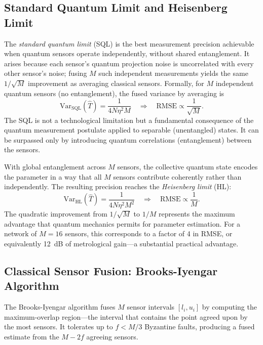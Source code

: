 \documentclass[twocolumn,11pt]{article}
\begin{document}
\subsection{Standard Quantum Limit and Heisenberg Limit}

The \textit{standard quantum limit} (SQL) is the best measurement
precision achievable when quantum sensors operate independently,
without shared entanglement.
It arises because each sensor's quantum projection noise is
uncorrelated with every other sensor's noise; fusing $M$ such
independent measurements yields the same $1/\sqrt{M}$ improvement
as averaging classical sensors.
Formally, for $M$ independent quantum sensors (no entanglement), the
fused variance by averaging is
\begin{equation}
    \mathrm{Var}_{\mathrm{SQL}}(\hat{T}) = \frac{1}{4N\eta^2 M}
    \quad \Rightarrow \quad
    \mathrm{RMSE} \propto \frac{1}{\sqrt{M}}.
    \label{eq:sql}
\end{equation}
The SQL is not a technological limitation but a fundamental
consequence of the quantum measurement postulate applied to
separable (unentangled) states.
It can be surpassed only by introducing quantum correlations
(entanglement) between the sensors.

With global entanglement across $M$ sensors, the collective
quantum state encodes the parameter in a way that all $M$ sensors
contribute coherently rather than independently.
The resulting precision reaches the \textit{Heisenberg limit} (HL):
\begin{equation}
    \mathrm{Var}_{\mathrm{HL}}(\hat{T}) = \frac{1}{4N\eta^2 M^2}
    \quad \Rightarrow \quad
    \mathrm{RMSE} \propto \frac{1}{M}.
    \label{eq:hl}
\end{equation}
The quadratic improvement from $1/\sqrt{M}$ to $1/M$ represents
the maximum advantage that quantum mechanics permits for parameter
estimation.
For a network of $M = 16$ sensors, this corresponds to a factor of
4 in RMSE, or equivalently 12~dB of metrological gain---a
substantial practical advantage.

\subsection{Classical Sensor Fusion: Brooks-Iyengar Algorithm}

The Brooks-Iyengar algorithm \cite{brooks1996robust} fuses $M$
sensor intervals $[l_i, u_i]$ by computing the maximum-overlap
region---the interval that contains the point agreed upon by the
most sensors.
It tolerates up to $f < M/3$ Byzantine faults, producing a fused
estimate from the $M - 2f$ agreeing sensors.
\end{document}
